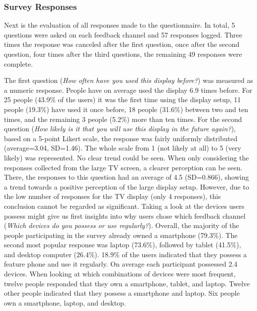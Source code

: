 	\subsubsection{Survey Responses}
	\label{5:results:survey}

	Next is the evaluation of all responses made to the questionnaire. In total, 5 questions were asked on each feedback channel and 57 responses logged. Three times the response was canceled after the first question, once after the second question, four times after the third questions, the remaining 49 responses were complete.

	The first question (\textit{How often have you used this display before?}) was measured as a numeric response. People have on average used the display 6.9 times before. For 25 people (43.9\% of the users) it was the first time using the display setup, 11 people (19.3\%) have used it once before, 18 people (31.6\%) between two and ten times, and the remaining 3 people (5.2\%) more than ten times.
	For the second question (\textit{How likely is it that you will use this display in the future again?}), based on a 5-point Likert scale, the response was fairly uniformly distributed (average=3.04, SD=1.46). The whole scale from 1 (not likely at all) to 5 (very likely) was represented. No clear trend could be seen. When only considering the responses collected from the large TV screen, a clearer perception can be seen. There, the responses to this question had an average of 4.5 (SD=0.866), showing a trend towards a positive perception of the large display setup. However, due to the low number of responses for the TV display (only 4 responses), this conclusion cannot be regarded as significant. 
	Taking a look at the devices users possess might give us first insights into why users chose which feedback channel (\textit{Which devices do you possess or use regularly?}). Overall, the majority of the people participating in the survey already owned a smartphone (79.3\%). The second most popular response was laptop (73.6\%), followed by tablet (41.5\%), and desktop computer (26.4\%). 18.9\% of the users indicated that they possess a feature phone and use it regularly. On average each participant possessed 2.4 devices. 
	When looking at which combinations of devices were most frequent, twelve people responded that they own a smartphone, tablet, and laptop. Twelve other people indicated that they possess a smartphone and laptop. Six people own a smartphone, laptop, and desktop.
